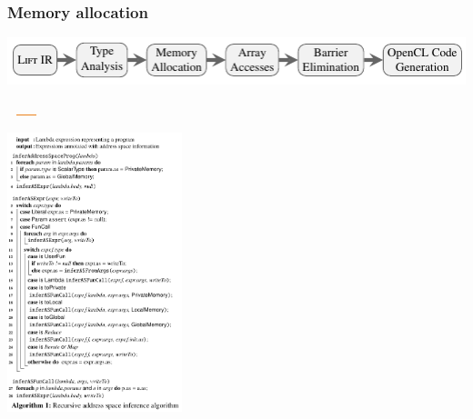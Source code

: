 \documentclass[10pt,usetotalslideindicator]{beamer}
\begin{document}
\begin{frame}[t]
\frametitle{Memory allocation}
    \vspace{-1cm}
    \begin{block}{}
        \begin{center}
            \includegraphics[width=1\textwidth]{../images/compilation_stages.pdf}
        \end{center}
        \vspace{-1.05cm}
        \hspace{3.36cm}
        \includegraphics[width=1.1cm, height=0.03cm]{../images/orange_bar.png}
        \vspace{.45cm}
    \vspace{-.8cm}
        \begin{center}
            \includegraphics[width=0.38\textwidth]{../images/address_space.pdf}
        \end{center}
    \end{block}
\end{frame}
\end{document}
